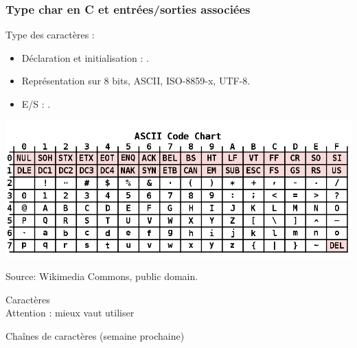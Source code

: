 \documentclass[xcolor=pdftex,svgnames,table]{beamer}
\begin{document}
\begin{frame}
  \frametitle{Type char  en C et entrées/sorties associées}  
Type des caractères \alert{} :
    \begin{itemize}
    \item Déclaration et initialisation : .
    \item Représentation sur 8 bits, ASCII, ISO-8859-x, UTF-8.
    \item E/S : \alert{}.
    \end{itemize}

\includegraphics[scale=0.31]{img/1000px-ASCII_Code_Chart.png}

\vspace{-0.3cm}
{\scriptsize\hfill  Source: Wikimedia Commons, public domain.}
\end{frame}


\begin{frame}
  
  \begin{block}{Caractères}
\\ \pause
    \alert{Attention :} mieux vaut utiliser 
  \end{block}\pause

\begin{block}{Chaînes de caractères (semaine prochaine) \aemporter}
\end{block}

\end{frame}
\end{document}
